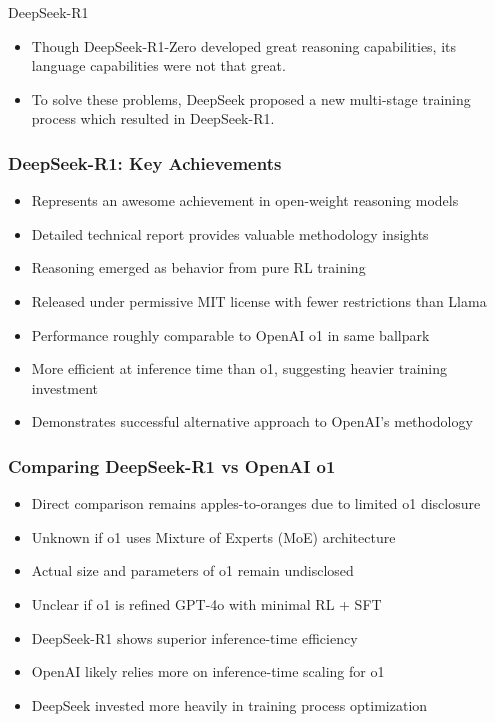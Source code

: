 \begin{frame}[fragile]{DeepSeek-R1}


    \begin{itemize}
        \item  Though DeepSeek-R1-Zero developed great reasoning capabilities, its 
language capabilities were not that great.
        \item  To solve these problems,  DeepSeek proposed a new multi-stage  
training process which resulted in DeepSeek-R1.
    \end{itemize}
\end{frame}



\begin{frame}[fragile]\frametitle{DeepSeek-R1: Key Achievements}
      \begin{itemize}
	\item Represents an awesome achievement in open-weight reasoning models
	\item Detailed technical report provides valuable methodology insights
	\item Reasoning emerged as behavior from pure RL training
	\item Released under permissive MIT license with fewer restrictions than Llama
	\item Performance roughly comparable to OpenAI o1 in same ballpark
	\item More efficient at inference time than o1, suggesting heavier training investment
	\item Demonstrates successful alternative approach to OpenAI's methodology
	  \end{itemize}
\end{frame}

\begin{frame}[fragile]\frametitle{Comparing DeepSeek-R1 vs OpenAI o1}
      \begin{itemize}
	\item Direct comparison remains apples-to-oranges due to limited o1 disclosure
	\item Unknown if o1 uses Mixture of Experts (MoE) architecture
	\item Actual size and parameters of o1 remain undisclosed
	\item Unclear if o1 is refined GPT-4o with minimal RL + SFT
	\item DeepSeek-R1 shows superior inference-time efficiency
	\item OpenAI likely relies more on inference-time scaling for o1
	\item DeepSeek invested more heavily in training process optimization
	  \end{itemize}
\end{frame}

